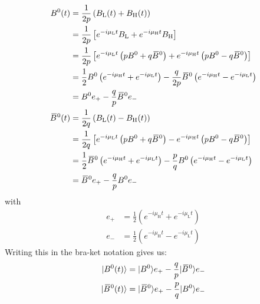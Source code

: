 \begin{align}
    B^0(t) &= \frac{1}{2p}\left(B_{\text{L}}(t)+B_{\text{H}}(t)\right)\nonumber\\
    &= \frac{1}{2p}\left[e^{-i\mu_{\text{L}}t}B_{\text{L}} + e^{-i\mu_{\text{H}}t}B_{\text{H}}\right]\nonumber\\
    &=\frac{1}{2p}\left[e^{-i\mu_{\text{L}}t}\left(pB^0 + q {\kern 0.18em\overline{\kern -0.18em B}{}{}^{\kern 0.06em 0}}\right) + e^{-i\mu_{\text{H}}t}\left(pB^0 - q {\kern 0.18em\overline{\kern -0.18em B}{}{}^{\kern 0.06em 0}}\right)\right] \nonumber\\
    &=\frac{1}{2}B^0\left(e^{-i\mu_{\text{H}}t} + e^{-i\mu_{\text{L}}t} \right) - \frac{q}{2p} {\kern 0.18em\overline{\kern -0.18em B}{}{}^{\kern 0.06em 0}} \left(e^{-i\mu_{\text{H}}t} - e^{-i\mu_{\text{L}}t} \right)\nonumber\\
    &= B^0 e_+ - \frac{q}{p} {\kern 0.18em\overline{\kern -0.18em B}{}{}^{\kern 0.06em 0}} e_-\\
    {\kern 0.18em\overline{\kern -0.18em B}{}{}^{\kern 0.06em 0}}(t) &= \frac{1}{2q}\left(B_{\text{L}}(t)-B_{\text{H}}(t)\right)\nonumber\\
    &= \frac{1}{2q} \left[e^{-i\mu_{\text{L}}t}\left(pB^0 + q {\kern 0.18em\overline{\kern -0.18em B}{}{}^{\kern 0.06em 0}}\right) - e^{-i\mu_{\text{H}}t}\left(pB^0 - q {\kern 0.18em\overline{\kern -0.18em B}{}{}^{\kern 0.06em 0}}\right)\right]\nonumber\\
    &= \frac{1}{2} {\kern 0.18em\overline{\kern -0.18em B}{}{}^{\kern 0.06em 0}} \left(e^{-i\mu_{\text{H}}t} + e^{-i\mu_{\text{L}}t} \right) -\frac{p}{q} B^0 \left(e^{-i\mu_{\text{H}}t} - e^{-i\mu_{\text{L}}t} \right)\nonumber\\
    &= {\kern 0.18em\overline{\kern -0.18em B}{}{}^{\kern 0.06em 0}} e_+ - \frac{q}{p}B^0 e_-
\end{align}
with
\begin{align}
    e_+ &= \frac{1}{2}\left(e^{-i\mu_{\text{H}}t} + e^{-i\mu_{\text{L}}t} \right)\\
    e_- &= \frac{1}{2}\left(e^{-i\mu_{\text{H}}t} - e^{-i\mu_{\text{L}}t} \right)
\end{align}
Writing this in the bra-ket notation gives us:
\begin{align}
    |B^0(t)\rangle = |B^0\rangle e_+ -\frac{q}{p} |{\kern 0.18em\overline{\kern -0.18em B}{}{}^{\kern 0.06em 0}}\rangle e_-\\
    |{\kern 0.18em\overline{\kern -0.18em B}{}{}^{\kern 0.06em 0}}(t)\rangle = |{\kern 0.18em\overline{\kern -0.18em B}{}{}^{\kern 0.06em 0}}\rangle e_+ -\frac{p}{q} |B^0\rangle e_-
\end{align}
